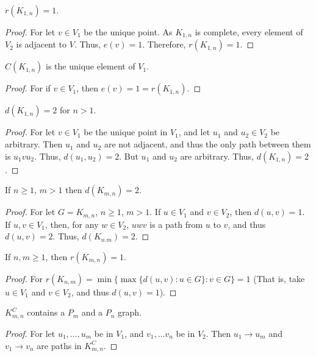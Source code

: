 \documentclass[crop=false,class=book,oneside]{standalone}
\begin{document}
        \begin{corollary}
        $r(K_{1,n}) = 1$.
        \end{corollary}
        \begin{proof}
        For let $v\in V_1$ be the unique point. As $K_{1,n}$ is complete, every element of $V_2$ is adjacent to $V$. Thus, $e(v) = 1$. Therefore, $r(K_{1,n}) =1$.
        \end{proof}
        \begin{corollary}
        $C(K_{1,n})$ is the unique element of $V_1$.
        \end{corollary}
        \begin{proof}
        For if $v\in V_1$, then $e(v) = 1 = r(K_{1,n})$.
        \end{proof}
        \begin{corollary}
        $d(K_{1,n})=2$ for $n>1$.
        \end{corollary}
        \begin{proof}
        For let $v\in V_1$ be the unique point in $V_1$, and let $u_1$ and $u_2 \in V_2$ be arbitrary. Then $u_1$ and $u_2$ are not adjacent, and thus the only path between them is $u_1 v u_2$. Thus, $d(u_1,u_2) = 2$. But $u_1$ and $u_2$ are arbitrary. Thus, $d(K_{1,n}) = 2$.
        \end{proof}
        \begin{corollary}
        If $n\geq1$, $m> 1$ then $d(K_{m,n}) = 2$.
        \end{corollary}
        \begin{proof}
        For let $G=K_{m,n}$, $n\geq1$, $m> 1$. If $u\in V_1$ and $v\in V_2$, then $d(u,v) = 1$. If $u,v\in V_1$, then, for any $w\in V_2$, $uwv$ is a path from $u$ to $v$, and thus $d(u,v) = 2$. Thus, $d(K_{n.m}) = 2$.
        \end{proof}
        \begin{corollary}
        If $n,m\geq 1$, then $r(K_{m,n}) = 1$.
        \end{corollary}
        \begin{proof}
        For $r(K_{n,m}) = \min\{ \max\{d(u,v):u\in G\}: v\in G\} = 1$ (That is, take $u\in V_1$ and $v\in V_2$, and thus $d(u,v)=1$).
        \end{proof}
        \begin{corollary}
        $K_{m,n}^C$ contains a $P_m$ and a $P_n$ graph.
        \end{corollary}
        \begin{proof}
        For let $u_1,\hdots, u_m$ be in $V_1$, and $v_1,\hdots v_n$ be in $V_2$. Then $u_1 \rightarrow u_m$ and $v_1 \rightarrow v_n$ are paths in $K_{m,n}^C$.
        \end{proof}
\end{document}
